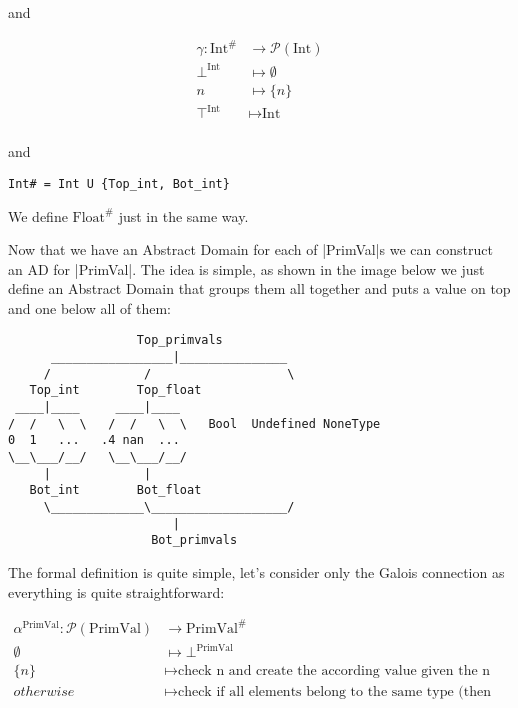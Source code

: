 and

\begin{align*}
  \gamma \colon \text{Int}^{\#} &\to \mathcal{P}(\text{Int}) \\
  \bot^{\text{Int}} &\mapsto \emptyset \\
  n &\mapsto \{n\} \\
  \top^{\text{Int}} &\mapsto \text{Int} \\
\end{align*}

and

\begin{verbatim}
Int# = Int U {Top_int, Bot_int}
\end{verbatim}

We define \(\text{Float}^{\#}\) just in the same way.

Now that we have an Abstract Domain for each of \pycode|PrimVal|s we can
construct an AD for \pycode|PrimVal|. The idea is simple, as shown in
the image below we just define an Abstract Domain that groups them all
together and puts a value on top and one below all of them:

{}

\begin{verbatim}
                  Top_primvals
      _________________|_______________
     /             /                   \
   Top_int        Top_float
 ____|____     ____|____
/  /   \  \   /  /   \  \   Bool  Undefined NoneType
0  1   ...   .4 nan  ...
\__\___/__/   \__\___/__/
     |             |
   Bot_int        Bot_float
     \_____________\___________________/
                       |
                    Bot_primvals
\end{verbatim}

The formal definition is quite simple, let's consider only the Galois
connection as everything is quite straightforward:

{}

\begin{align*}
  \alpha^{\text{PrimVal}} \colon \mathcal{P}(\text{PrimVal}) &\to \text{PrimVal}^{\#} \\
  \emptyset &\mapsto \bot^{\text{PrimVal}} \\
  \{n\} &\mapsto \text{check n and create the according value given the n type} \\
  otherwise &\mapsto \text{check if all elements belong to the same type (then same alpha)
  otherwise Top primval} \\
\end{align*}

